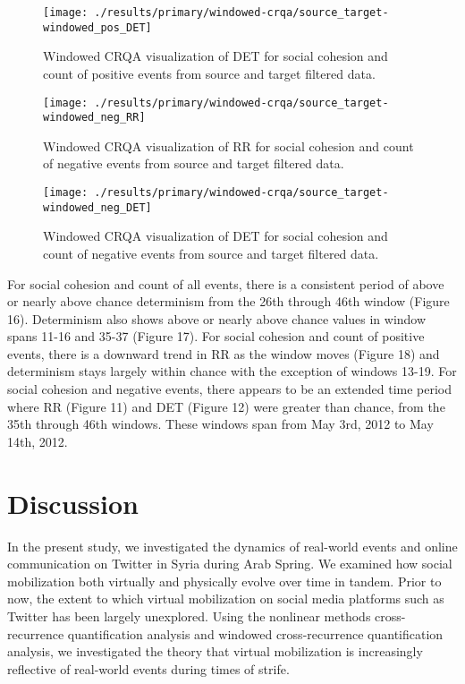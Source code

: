 \documentclass[english,man]{apa6}
\begin{document}
\begin{figure}
\texttt{[image: ./results/primary/windowed-crqa/source\_target-windowed\_pos\_DET]} \caption{Windowed CRQA visualization of DET for social cohesion and count of positive events from source and target filtered data.}\label{fig:plot-DET-source-targ-pos}
\end{figure}

\begin{figure}
\texttt{[image: ./results/primary/windowed-crqa/source\_target-windowed\_neg\_RR]} \caption{Windowed CRQA visualization of RR for social cohesion and count of negative events from source and target filtered data.}\label{fig:plot-RR-source-targ-neg}
\end{figure}

\begin{figure}
\texttt{[image: ./results/primary/windowed-crqa/source\_target-windowed\_neg\_DET]} \caption{Windowed CRQA visualization of DET for social cohesion and count of negative events from source and target filtered data.}\label{fig:plot-DET-source-targ-neg}
\end{figure}

For social cohesion and count of all events, there is a consistent period of above or nearly above chance determinism from the 26th through 46th window (Figure 16). Determinism also shows above or nearly above chance values in window spans 11-16 and 35-37 (Figure 17). For social cohesion and count of positive events, there is a downward trend in RR as the window moves (Figure 18) and determinism stays largely within chance with the exception of windows 13-19. For social cohesion and negative events, there appears to be an extended time period where RR (Figure 11) and DET (Figure 12) were greater than chance, from the 35th through 46th windows. These windows span from May 3rd, 2012 to May 14th, 2012.

\hypertarget{discussion}{%
\section{Discussion}\label{discussion}}

In the present study, we investigated the dynamics of real-world events and online communication on Twitter in Syria during Arab Spring. We examined how social mobilization both virtually and physically evolve over time in tandem. Prior to now, the extent to which virtual mobilization on social media platforms such as Twitter has been largely unexplored. Using the nonlinear methods cross-recurrence quantification analysis and windowed cross-recurrence quantification analysis, we investigated the theory that virtual mobilization is increasingly reflective of real-world events during times of strife.
\end{document}
